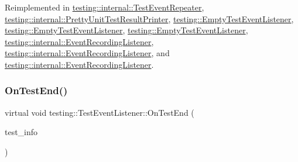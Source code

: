 Reimplemented in \mbox{\hyperlink{classtesting_1_1internal_1_1_test_event_repeater_a70124c738caa338bcd723eb2a51c8b3e}{testing\+::internal\+::\+Test\+Event\+Repeater}}, \mbox{\hyperlink{classtesting_1_1internal_1_1_pretty_unit_test_result_printer_adcb68c729565d4bcdf8418a52902c3de}{testing\+::internal\+::\+Pretty\+Unit\+Test\+Result\+Printer}}, \mbox{\hyperlink{classtesting_1_1_empty_test_event_listener_a7f9a84967fde01000b7a56e9e84b6052}{testing\+::\+Empty\+Test\+Event\+Listener}}, \mbox{\hyperlink{classtesting_1_1_empty_test_event_listener_a7f9a84967fde01000b7a56e9e84b6052}{testing\+::\+Empty\+Test\+Event\+Listener}}, \mbox{\hyperlink{classtesting_1_1_empty_test_event_listener_ae4707ed9cc7ace5241bc8ccc4051209b}{testing\+::\+Empty\+Test\+Event\+Listener}}, \mbox{\hyperlink{classtesting_1_1internal_1_1_event_recording_listener_a3ce90fda790857eb64444038a5b3258f}{testing\+::internal\+::\+Event\+Recording\+Listener}}, \mbox{\hyperlink{classtesting_1_1internal_1_1_event_recording_listener_a3ce90fda790857eb64444038a5b3258f}{testing\+::internal\+::\+Event\+Recording\+Listener}}, and \mbox{\hyperlink{classtesting_1_1internal_1_1_event_recording_listener_a18c28e1d1c3a1e74e225966456786f8e}{testing\+::internal\+::\+Event\+Recording\+Listener}}.

\mbox{\label{classtesting_1_1_test_event_listener_abb1c44525ef038500608b5dc2f17099b}} 
\subsubsection{\texorpdfstring{OnTestEnd()}{OnTestEnd()}\hspace{0.1cm}{\footnotesize\ttfamily [1/3]}}
{\footnotesize\ttfamily virtual void testing\+::\+Test\+Event\+Listener\+::\+On\+Test\+End (\begin{DoxyParamCaption}\item[{const \mbox{\hyperlink{classtesting_1_1_test_info}{Test\+Info}} \&}]{test\+\_\+info }\end{DoxyParamCaption})\hspace{0.3cm}{\ttfamily [pure virtual]}}



